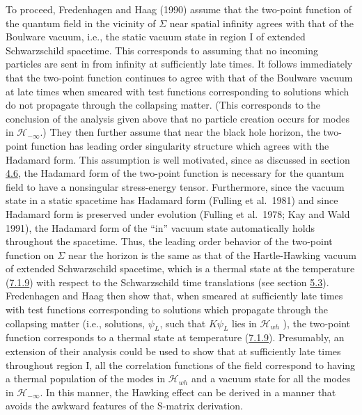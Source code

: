 \documentclass[11pt,a4paper]{article}
\begin{document}
To proceed, Fredenhagen and Haag (1990) assume that the two-point function of the quantum field in the vicinity of \(\Sigma\) near spatial infinity agrees with that of the Boulware vacuum, i.e., the static vacuum state in region I of extended Schwarzschild spacetime. This \hypertarget{source-174}{} corresponds to assuming that no incoming particles are sent in from infinity at sufficiently late times. It follows immediately that the two-point function continues to agree with that of the Boulware vacuum at late times when smeared with test functions corresponding to solutions which do not propagate through the collapsing matter. (This corresponds to the conclusion of the analysis given above that no particle creation occurs for modes in \(\mathcal{H}_{-\infty}\).) They then further assume that near the black hole horizon, the two-point function has leading order singularity structure which agrees with the Hadamard form. This assumption is well motivated, since as discussed in section \hyperlink{sec:4.6}{4.6}, the Hadamard form of the two-point function is necessary for the quantum field to have a nonsingular stress-energy tensor. Furthermore, since the vacuum state in a static spacetime has Hadamard form (Fulling et al.~1981) and since Hadamard form is preserved under evolution (Fulling et al.~1978; Kay and Wald 1991), the Hadamard form of the ``in'' vacuum state automatically holds throughout the spacetime. Thus, the leading order behavior of the two-point function on \(\Sigma\) near the horizon is the same as that of the Hartle-Hawking vacuum of extended Schwarzschild spacetime, which is a thermal state at the temperature (\hyperref[eq:7.1.9]{7.1.9}) with respect to the Schwarzschild time translations (see section \hyperlink{sec:5.3}{5.3}). Fredenhagen and Haag then show that, when smeared at sufficiently late times with test functions corresponding to solutions which propagate through the collapsing matter (i.e., solutions, \(\psi_L\), such that \(K\psi_L\) lies in \(\mathcal{H}_{wh}\) ), the two-point function corresponds to a thermal state at temperature (\hyperref[eq:7.1.9]{7.1.9}). Presumably, an extension of their analysis could be used to show that at sufficiently late times throughout region I, all the correlation functions of the field correspond to having a thermal population of the modes in \(\mathcal{H}_{wh}\) and a vacuum state for all the modes in \(\mathcal{H}_{-\infty}\). In this manner, the Hawking effect can be derived in a manner that avoids the awkward features of the S-matrix derivation.
\end{document}
